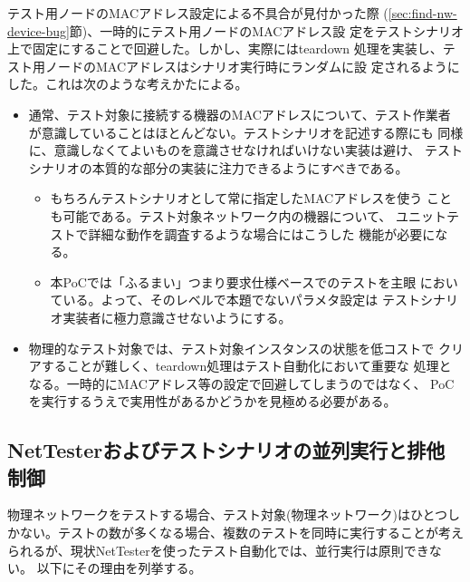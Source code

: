 テスト用ノードのMACアドレス設定による不具合が見付かった際
(\ref{sec:find-nw-device-bug}節)、一時的にテスト用ノードのMACアドレス設
定をテストシナリオ上で固定にすることで回避した。しかし、実際にはteardown
処理を実装し、テスト用ノードのMACアドレスはシナリオ実行時にランダムに設
定されるようにした。これは次のような考えかたによる。
\begin{itemize}
 \item 通常、テスト対象に接続する機器のMACアドレスについて、テスト作業者
       が意識していることはほとんどない。テストシナリオを記述する際にも
       同様に、意識しなくてよいものを意識させなければいけない実装は避け、
       テストシナリオの本質的な部分の実装に注力できるようにすべきである。
       \begin{itemize}
        \item もちろんテストシナリオとして常に指定したMACアドレスを使う
              ことも可能である。テスト対象ネットワーク内の機器について、
              ユニットテストで詳細な動作を調査するような場合にはこうした
              機能が必要になる。
        \item 本PoCでは「ふるまい」つまり要求仕様ベースでのテストを主眼
              においている。よって、そのレベルで本題でないパラメタ設定は
              テストシナリオ実装者に極力意識させないようにする。
       \end{itemize}
 \item 物理的なテスト対象では、テスト対象インスタンスの状態を低コストで
       クリアすることが難しく、teardown処理はテスト自動化において重要な
       処理となる。一時的にMACアドレス等の設定で回避してしまうのではなく、
       PoCを実行するうえで実用性があるかどうかを見極める必要がある。
\end{itemize}

  \subsection{NetTesterおよびテストシナリオの並列実行と排他制御}
  \label{sec:testscenario-excl-ctrl}

物理ネットワークをテストする場合、テスト対象(物理ネットワーク)はひとつし
かない。テストの数が多くなる場合、複数のテストを同時に実行することが考え
られるが、現状NetTesterを使ったテスト自動化では、並行実行は原則できない。
以下にその理由を列挙する。

